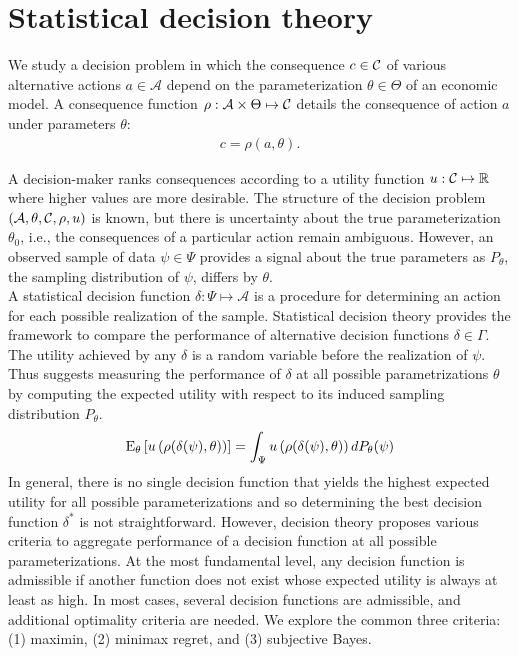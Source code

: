 \section*{Statistical decision theory}
We study a decision problem in which the consequence $c \in \mathcal{C}$ of various alternative actions $a\in\mathcal{A}$ depend on the parameterization $\theta\in \Theta$ of an economic model. A consequence function $\rho: \mathcal{A} \times \Theta \mapsto \mathcal{C}$  details the consequence of action $a$ under parameters $\theta$:
%
\begin{align*}
c = \rho(a, \theta).
\end{align*}

A decision-maker ranks consequences according to a utility function $u: \mathcal{C} \mapsto \mathbb{R}$ where higher values are more desirable. The structure of the decision problem $(\mathcal{A}, \theta, \mathcal{C}, \rho, u)$ is known, but there is uncertainty about the true parameterization $\theta_0$, i.e., the consequences of a particular action remain ambiguous. However, an observed sample of data $\psi \in \Psi$ provides a signal about the true parameters as $P_{\theta}$, the sampling distribution of $\psi$, differs by $\theta$.\\

A statistical decision function $\delta: \Psi \mapsto \mathcal{A}$ is a procedure for determining an action for each possible realization of the sample. Statistical decision theory provides the framework to compare the performance of alternative decision functions  $\delta \in \Gamma$. The utility achieved by any $\delta$ is a random variable before the realization of $\psi$. Thus \citet{Wald.1950} suggests measuring the performance of $\delta$ at all possible parametrizations $\theta$ by computing the expected utility with respect to its induced sampling distribution $P_\theta$.
%
\begin{align*}
  \mathrm{E}_{\theta}\left[u\left(\rho(\delta(\psi), \theta)\right)\right] = \int_\Psi u\left(\rho(\delta(\psi), \theta)\right) d P_{\theta}(\psi)
\end{align*}
%
In general, there is no single decision function that yields the highest expected utility for all possible parameterizations and so determining the best decision function  $\delta^*$ is not straightforward. However, decision theory proposes various criteria \citep{Gilboa.2009,Marinacci.2015} to aggregate performance of a decision function at all possible parameterizations. At the most fundamental level, any decision function is admissible if another function does not exist whose expected utility is always at least as high. In most cases, several decision functions are admissible, and additional optimality criteria are needed. We explore the common three criteria: (1) maximin, (2) minimax regret, and (3) subjective Bayes.\\


